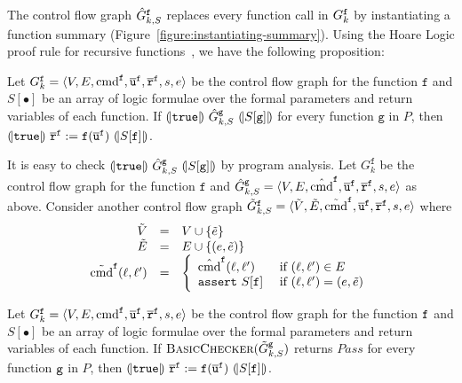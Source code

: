 The control flow graph $\hat{G}^{\mathtt{{f}}}_{k,S}$ replaces every
function call in $G_k^{\mathtt{{f}}}$ by instantiating a function
summary (Figure~\ref{figure:instantiating-summary}).
Using the Hoare Logic proof rule for recursive functions~\cite{Oheimb99}, we have the
following proposition:
\begin{proposition}
  \label{proposition:check_summary}
  Let $G^{\mathtt{{f}}}_k = \langle V, E, \textmd{cmd}^{\mathtt{{f}}}, \overline{\mathtt{u}}^{\mathtt{{f}}}, \overline{\mathtt{r}}^{\mathtt{{f}}},s,e \rangle$ be the control flow graph for the function
  $\mathtt{f}$ and $S[\bullet]$ be an array of logic formulae over the formal
  parameters and return variables of each function. If $(\!| {\mathtt{true}} |\!)\
  \hat{G}^{\mathtt{{g}}}_{k,S}\ (\!| {S[\mathtt{g}]} |\!)$ for every
  function $\mathtt{g}$ in $P$, then $\assert{\TT}\ \mathtt{\overline{r}}^\fun{f} :=
  \fun{f} (\overline{\mathtt{u}}^\fun{f})\ \assert{S[\fun{f}]}$.
\end{proposition}

It is easy to check $\assert{\TT}\ \hat{G}^\fun{g}_{k,S}\
\assert{S[\mathtt{g}]}$ by program analysis. Let $G_k^{\mathtt{f}}$ be
the control flow graph for the function $\mathtt{f}$ and
$\hat{G}^{\mathtt{{g}}}_{k,S} = \langle V, E, \hat{\textmd{cmd}}^{\mathtt{{f}}}, \overline{\mathtt{u}}^{\mathtt{{f}}}, \overline{\mathtt{r}}^{\mathtt{{f}}},s,e \rangle$ as
above. Consider another control flow graph $\tilde{G}^{\mathtt{{f}}}_{k,S} =
\langle \tilde{V}, \tilde{E}, \tilde{\textmd{cmd}}^{\mathtt{{f}}} , \overline{\mathtt{u}}^{\mathtt{{f}}}, \overline{\mathtt{r}}^{\mathtt{{f}}},s,e \rangle$ where
\begin{equation*}
  \begin{array}{rcl}
    \tilde{V} & = & V \cup \{ \tilde{e} \}\\
    \tilde{E} & = & E \cup \{ (e, \tilde{e}) \}\\
    \tilde{\textmd{cmd}}^{\mathtt{{f}}} (\ell, \ell') & = &
    \left\{
      \begin{array}{ll}
        \hat{\textmd{cmd}}^{\mathtt{{f}}} (\ell, \ell') & 
        \textmd{ if } (\ell, \ell') \in E\\
        \mathtt{assert\ } S[\mathtt{f}] &
        \textmd{ if } (\ell, \ell') = (e, \tilde{e})
      \end{array}
    \right.
  \end{array}
\end{equation*}

\begin{corollary}
  Let $G^{\mathtt{{f}}}_k = \langle V, E, \textmd{cmd}^{\mathtt{{f}}}, \overline{\mathtt{u}}^{\mathtt{{f}}}, \overline{\mathtt{r}}^{\mathtt{{f}}},s,e \rangle$ be the control flow graph for the function
  $\mathtt{{f}}$ and $S[\bullet]$ be an array of logic formulae over the formal
  parameters and return variables of each function. If $\textsc{BasicChecker}
  (\tilde{G}^{\mathtt{{g}}}_{k,S})$ returns $\mathit{Pass}$ for every function
  $\mathtt{{g}}$ in $P$, then $\assert{\TT}\ \mathtt{\overline{r}}^\fun{f} :=
  \mathtt{f} (\overline{\mathtt{u}}^\fun{f})\ \assert{S[\mathtt{f}]}$.
  \label{corollary:check-summary}
\end{corollary}

